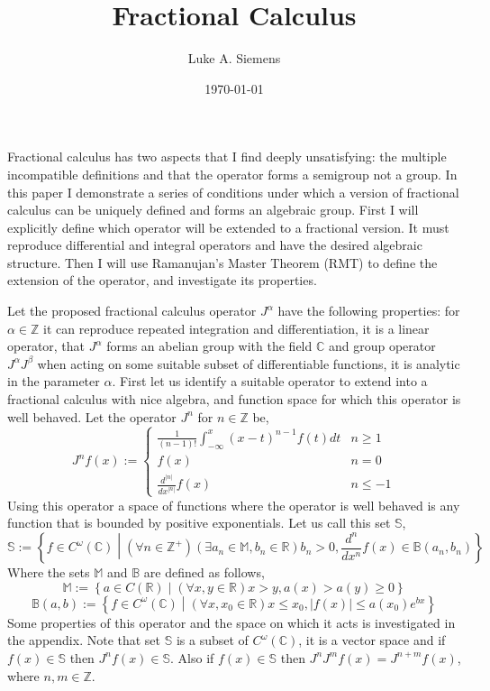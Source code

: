 \documentclass[%
 onecolumn,
 amsmath, amssymb, aps, pra, 10pt
]{revtex4-2}
\begin{document}
\title{Fractional Calculus}%
\author{Luke A. Siemens}
\noaffiliation
\date{\today}
\maketitle

Fractional calculus has two aspects that I find deeply unsatisfying: the multiple incompatible definitions and that the operator forms a semigroup not a group. In this paper I demonstrate a series of conditions under which a version of fractional calculus can be uniquely defined and forms an algebraic group. First I will explicitly define which operator will be extended to a fractional version. It must reproduce differential and integral operators and have the desired algebraic structure. Then I will use Ramanujan's Master Theorem (RMT) to define the extension of the operator, and investigate its properties.

Let the proposed fractional calculus operator $J^\alpha$ have the following properties: for $\alpha \in \mathbb{Z}$ it can reproduce repeated integration and differentiation, it is a linear operator, that $J^\alpha$ forms an abelian group with the field $\mathbb{C}$ and group operator $J^\alpha J^\beta$ when acting on some suitable subset of differentiable functions, it is analytic in the parameter $\alpha$. First let us identify a suitable operator to extend into a fractional calculus with nice algebra, and function space for which this operator is well behaved. Let the operator $J^n$ for $n \in \mathbb{Z}$ be,
\begin{equation}
J^n f(x) := \begin{cases} \frac{1}{(n-1)!}\int_{-\infty}^x (x - t)^{n - 1}f(t)dt & n \geq 1 \\ f(x) & n = 0 \\ \frac{d^{\left|n\right|}}{dx^{\left|n\right|}}f(x) & n \leq -1 \end{cases}
\label{integer_calculus}
\end{equation}
Using this operator a space of functions where the operator is well behaved is any function that is bounded by positive exponentials. Let us call this set $\mathbb{S}$,
\begin{equation}
\mathbb{S} := \left\lbrace f \in C^\omega(\mathbb{C}) \middle| (\forall n \in \mathbb{Z}^+)(\exists a_n \in \mathbb{M}, b_n \in \mathbb{R}) b_n > 0, \frac{d^n}{dx^n}f(x) \in \mathbb{B}(a_n, b_n) \right\rbrace
\label{exponentialy_bounded}
\end{equation}
Where the sets $\mathbb{M}$ and $\mathbb{B}$ are defined as follows,
\[\mathbb{M} := \left\lbrace a \in C(\mathbb{R}) \middle| (\forall x, y \in \mathbb{R}) x > y, a(x) > a(y) \geq 0 \right\rbrace\]
\[\mathbb{B}(a, b) := \left\lbrace f \in C^\omega(\mathbb{C}) \middle| (\forall x, x_0 \in \mathbb{R}) x \leq x_0, |f(x)| \leq a(x_0)e^{bx} \right\rbrace\]
Some properties of this operator and the space on which it acts is investigated in the appendix. Note that set $\mathbb{S}$ is a subset of $C^{\omega}(\mathbb{C})$, it is a vector space and if $f(x) \in \mathbb{S}$ then $J^n f(x) \in \mathbb{S}$. Also if $f(x) \in \mathbb{S}$ then $J^n J^m f(x) = J^{n + m} f(x)$, where $n, m \in \mathbb{Z}$.
\end{document}
